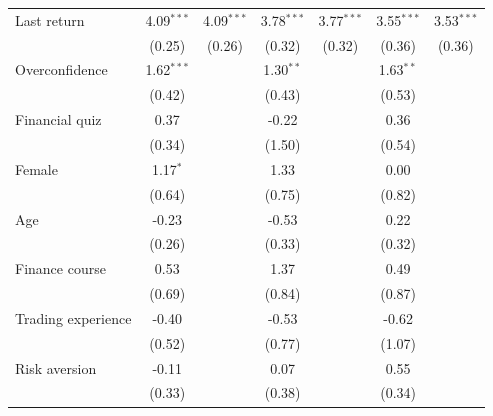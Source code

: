 \begin{tabular}{lcccccc}
   Last return                       & 4.09$^{***}$ & 4.09$^{***}$ & 3.78$^{***}$ & 3.77$^{***}$ & 3.55$^{***}$  & 3.53$^{***}$\\   
                                     & (0.25)       & (0.26)       & (0.32)       & (0.32)       & (0.36)        & (0.36)\\   
   Overconfidence                    & 1.62$^{***}$ &              & 1.30$^{**}$  &              & 1.63$^{**}$   &   \\   
                                     & (0.42)       &              & (0.43)       &              & (0.53)        &   \\   
   Financial quiz                    & 0.37         &              & -0.22        &              & 0.36          &   \\   
                                     & (0.34)       &              & (1.50)       &              & (0.54)        &   \\   
   Female                            & 1.17$^{*}$   &              & 1.33         &              & 0.00          &   \\   
                                     & (0.64)       &              & (0.75)       &              & (0.82)        &   \\   
   Age                               & -0.23        &              & -0.53        &              & 0.22          &   \\   
                                     & (0.26)       &              & (0.33)       &              & (0.32)        &   \\   
   Finance course                    & 0.53         &              & 1.37         &              & 0.49          &   \\   
                                     & (0.69)       &              & (0.84)       &              & (0.87)        &   \\   
   Trading experience                & -0.40        &              & -0.53        &              & -0.62         &   \\   
                                     & (0.52)       &              & (0.77)       &              & (1.07)        &   \\   
   Risk aversion                     & -0.11        &              & 0.07         &              & 0.55          &   \\   
                                     & (0.33)       &              & (0.38)       &              & (0.34)        &   \\   

\end{tabular}
